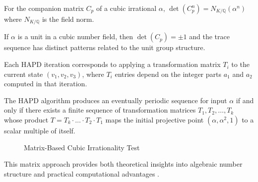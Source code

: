 \begin{theorem}
For the companion matrix $C_p$ of a cubic irrational $\alpha$, $\det(C_p^n) = N_{K/\mathbb{Q}}(\alpha^n)$ where $N_{K/\mathbb{Q}}$ is the field norm.
\end{theorem}

\begin{proposition}
If $\alpha$ is a unit in a cubic number field, then $\det(C_p) = \pm 1$ and the trace sequence has distinct patterns related to the unit group structure.
\end{proposition}

\begin{proposition}\label{prop:matrix_hapd}
Each HAPD iteration corresponds to applying a transformation matrix $T_i$ to the current state $(v_1, v_2, v_3)$, where $T_i$ entries depend on the integer parts $a_1$ and $a_2$ computed in that iteration.
\end{proposition}

\begin{theorem}\label{thm:matrix_periodicity}
The HAPD algorithm produces an eventually periodic sequence for input $\alpha$ if and only if there exists a finite sequence of transformation matrices $T_1, T_2, \ldots, T_k$ whose product $T = T_k \cdot \ldots \cdot T_2 \cdot T_1$ maps the initial projective point $(\alpha, \alpha^2, 1)$ to a scalar multiple of itself.
\end{theorem}

\begin{figure}[htbp]
\centering
{}
\caption{Matrix-Based Cubic Irrationality Test}
\label{alg:matrix_cubic}
\end{figure}

This matrix approach provides both theoretical insights into algebraic number structure and practical computational advantages \cite{Ferguson1999, Lenstra1982}.
